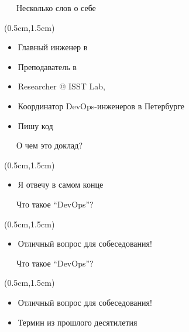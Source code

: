 \documentclass[xetex,18pt,aspectratio=43]{beamer}
\begin{document}
\begin{Large}
\begin{frame}{\ \ \ Несколько слов о себе}
\begin{textblock*}{\framewidth-0.8cm}(0.5cm,1.5cm)
\begin{itemize}
  \item Главный инженер в \href{https://gitinsky.com}{\color{blue}{Git in Sky}}
  \item Преподаватель в \href{http://avalon.ru}{\color{blue}{avalon.ru}}
  \item Researcher @ ISST Lab, \href{http://ifmo.ru}{\color{blue}{ITMO}}
  \item Координатор \href{https://meetup.com/DevOps-40}{\color{blue}{встреч}} DevOps-инженеров в Петербурге
  \item Пишу код
\end{itemize}
\end{textblock*}
\end{frame}

\begin{frame}{\ \ \ О чем это доклад?}
\begin{textblock*}{\framewidth-0.8cm}(0.5cm,1.5cm)
\begin{itemize}
  \item Я отвечу в самом конце
\end{itemize}
\end{textblock*}
\end{frame}

\begin{frame}{\ \ \ Что такое \enquote{DevOps}?}
\begin{textblock*}{\framewidth-0.8cm}(0.5cm,1.5cm)
\begin{itemize}
  \item Отличный вопрос для собеседования!
\end{itemize}
\end{textblock*}
\end{frame}

\begin{frame}{\ \ \ Что такое \enquote{DevOps}?}
\begin{textblock*}{\framewidth-0.8cm}(0.5cm,1.5cm)
\begin{itemize}
  \item Отличный вопрос для собеседования!
  \item Термин из прошлого десятилетия
\end{itemize}
\end{textblock*}
\end{frame}


\end{Large}
\end{document}
